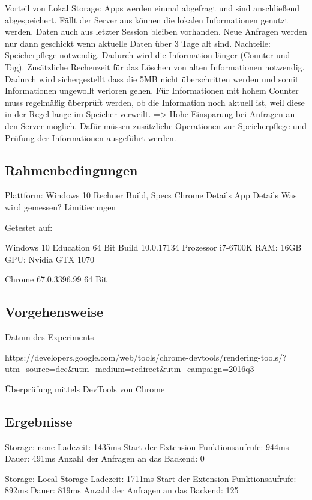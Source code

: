 Vorteil von Lokal Storage: Apps werden einmal abgefragt und sind anschließend abgespeichert. Fällt der Server aus können die lokalen Informationen genutzt werden. Daten auch aus letzter Session bleiben vorhanden. Neue Anfragen werden nur dann geschickt wenn aktuelle Daten über 3 Tage alt sind.
Nachteile: Speicherpflege notwendig. Dadurch wird die Information länger (Counter und Tag). Zusätzliche Rechenzeit für das Löschen von alten Informationen notwendig. Dadurch wird sichergestellt dass die 5MB nicht überschritten werden und somit Informationen ungewollt verloren gehen. Für Informationen mit hohem Counter muss regelmäßig überprüft werden, ob die Information noch aktuell ist, weil diese in der Regel lange im Speicher verweilt.
=> Hohe Einsparung bei Anfragen an den Server möglich. Dafür müssen zusätzliche Operationen zur Speicherpflege und Prüfung der Informationen ausgeführt werden.

\subsection{Rahmenbedingungen}
\label{ss:method2}

Plattform: Windows 10 Rechner Build, Specs
Chrome Details
App Details
Was wird gemessen?
Limitierungen

Getestet auf:

Windows 10 Education 64 Bit
Build 10.0.17134
Prozessor i7-6700K
RAM: 16GB
GPU: Nvidia GTX 1070

Chrome  67.0.3396.99 64 Bit


\subsection{Vorgehensweise}
\label{ss:datasource2}

Datum des Experiments

https://developers.google.com/web/tools/chrome-devtools/rendering-tools/?utm_source=dcc&utm_medium=redirect&utm_campaign=2016q3

Überprüfung mittels DevTools von Chrome

\subsection{Ergebnisse}
\label{ss:results2}

Storage: none
Ladezeit: 1435ms
Start der Extension-Funktionsaufrufe: 944ms
Dauer: 491ms
Anzahl der Anfragen an das Backend: 0


Storage: Local Storage
Ladezeit: 1711ms
Start der Extension-Funktionsaufrufe: 892ms
Dauer: 819ms
Anzahl der Anfragen an das Backend: 125


